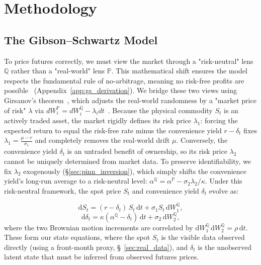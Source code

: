\documentclass[11pt, a4paper]{article}
\newcommand{\convyield}{\delta}             %
\newcommand{\meanrev}{\kappa}               %
\newcommand{\longrun}{\alpha}               %
\begin{document}
\section{Methodology}
\label{sec:methodology}

\subsection{The Gibson--Schwartz Model}
\label{sec:gs_model}
To price futures correctly, we must view the market through a "risk-neutral" lens $\mathbb{Q}$ rather than a "real-world" lens $\mathbb{P}$. This mathematical shift ensures the model respects the fundamental rule of no-arbitrage, meaning no risk-free profits are possible~\cite{girsanov1960transforming, harrison1981martingales, Schwartz1997TheHedging} (Appendix~\ref{app:gs_derivation}). We bridge these two views using Girsanov's theorem~\cite{girsanov1960transforming}, which adjusts the real-world randomness by a "market price of risk" $\lambda$ via $dW^{\mathbb{P}}_i = dW^{\mathbb{Q}}_i - \lambda_i dt$~\cite{Schwartz1997TheHedging}. Because the physical commodity $S_t$ is an actively traded asset, the market rigidly defines its risk price $\lambda_1$: forcing the expected return to equal the risk-free rate minus the convenience yield $r - \delta_t$ fixes $\lambda_1 = \frac{\mu - r}{\sigma_1}$ and completely removes the real-world drift $\mu$. Conversely, the convenience yield $\delta_t$ is an untraded benefit of ownership, so its risk price $\lambda_2$ cannot be uniquely determined from market data. To preserve identifiability, we fix $\lambda_2$ exogenously (\S\ref{sec:pinn_inversion}), which simply shifts the convenience yield's long-run average to a risk-neutral level: $\longrun^{\mathbb{Q}} = \longrun^{\mathbb{P}} -\sigma_2\lambda_2/\meanrev$. Under this risk-neutral framework, the spot price $S_t$ and convenience yield $\convyield_t$ evolve as:

\begin{equation}
  \label{eq:gs_spot}
  \mathrm{d}S_t = (r - \convyield_t)\,S_t\,\mathrm{d}t + \sigma_1 S_t\,\mathrm{d}W_1^{\mathbb{Q}},
\end{equation}
\begin{equation}
  \label{eq:gs_cy}
  \mathrm{d}\convyield_t = \meanrev(\longrun^{\mathbb{Q}} - \convyield_t)\,\mathrm{d}t + \sigma_2\,\mathrm{d}W_2^{\mathbb{Q}},
\end{equation}
\noindent
where the two Brownian motion increments are correlated by $\mathrm{d}W_1^{\mathbb{Q}}\,\mathrm{d}W_2^{\mathbb{Q}} = \rho\,\mathrm{d}t$. These form our state equations, where the spot $S_t$ is the visible data observed directly (using a front-month proxy, \S~\ref{sec:real_data}), and $\convyield_t$ is the unobserved latent state that must be inferred from observed futures prices.
\end{document}
